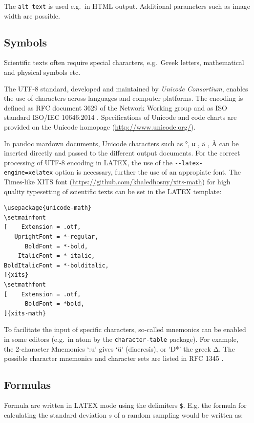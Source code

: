 \documentclass[10pt,fleqn]{wlpeerj}
\begin{document}
The
\texttt{alt\ text}
is
used
e.g.~in
HTML
output.
Additional
parameters
such
as
image
width
are
possible.

\subsection{Symbols}\label{symbols}

Scientific
texts
often
require
special
characters,
e.g.~Greek
letters,
mathematical
and
physical
symbols
etc.

The
UTF-8
standard,
developed
and
maintained
by
\emph{Unicode
Consortium},
enables
the
use
of
characters
across
languages
and
computer
platforms.
The
encoding
is
defined
as
RFC
document
3629
of
the
Network
Working
group
\citep{rfc3629}
and
as
ISO
standard
ISO/IEC
10646:2014
\citep{international_organization_for_standardization_iso/iec_2014}.
Specifications
of
Unicode
and
code
charts
are
provided
on
the
Unicode
homopage
(\url{http://www.unicode.org/}).

In
pandoc
mardown
documents,
Unicode
characters
such
as °,
α , ä
, Å
can
be
inserted
directly
and
passed
to
the
different
output
documents.
For
the
correct
processing
of
UTF-8
encoding
in
LATEX,
the
use
of
the
\texttt{-\/-latex-engine=xelatex}
option
is
necessary,
further
the
use
of an
appropiate
font.
The
Times-like
XITS
font
(\url{https://github.com/khaledhosny/xits-math})
for
high
quality
typesetting
of
scientific
texts
can
be
set
in
the
LATEX
template:

\begin{verbatim}
\usepackage{unicode-math}
\setmainfont
[    Extension = .otf,
   UprightFont = *-regular,
      BoldFont = *-bold,
    ItalicFont = *-italic,
BoldItalicFont = *-bolditalic,
]{xits}
\setmathfont
[    Extension = .otf,
      BoldFont = *bold,
]{xits-math}
\end{verbatim}

To
facilitate
the
input
of
specific
characters,
so-called
mnemonics
can
be
enabled
in
some
editors
(e.g.~in
atom
by
the
\texttt{character-table}
package).
For
example,
the
2-character
Mnemonics
`:u'
gives
`ü'
(diaeresis),
or
'D*'
the
greek
Δ.
The
possible
character
mnemonics
and
character
sets
are
listed
in
RFC
1345
\citep{rfc1345}.

\subsection{Formulas}\label{formulas}

Formula
are
written
in
LATEX
mode
using
the
delimiters
\texttt{\$}.
E.g.
the
formula
for
calculating
the
standard
deviation
\(s\)
of a
random
sampling
would
be
written
as:
\end{document}
